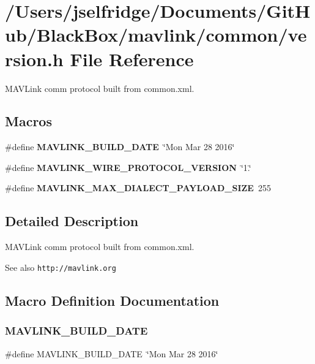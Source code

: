\section{/\+Users/jselfridge/\+Documents/\+Git\+Hub/\+Black\+Box/mavlink/common/version.h File Reference}
\label{common_2version_8h}


M\+A\+V\+Link comm protocol built from common.\+xml.  


\subsection*{Macros}
\begin{DoxyCompactItemize}
\item 
\#define \textbf{ M\+A\+V\+L\+I\+N\+K\+\_\+\+B\+U\+I\+L\+D\+\_\+\+D\+A\+TE}~\char`\"{}Mon Mar 28 2016\char`\"{}
\item 
\#define \textbf{ M\+A\+V\+L\+I\+N\+K\+\_\+\+W\+I\+R\+E\+\_\+\+P\+R\+O\+T\+O\+C\+O\+L\+\_\+\+V\+E\+R\+S\+I\+ON}~\char`\"{}1.\char`\"{}
\item 
\#define \textbf{ M\+A\+V\+L\+I\+N\+K\+\_\+\+M\+A\+X\+\_\+\+D\+I\+A\+L\+E\+C\+T\+\_\+\+P\+A\+Y\+L\+O\+A\+D\+\_\+\+S\+I\+ZE}~255
\end{DoxyCompactItemize}


\subsection{Detailed Description}
M\+A\+V\+Link comm protocol built from common.\+xml. 

\begin{DoxySeeAlso}{See also}
{\tt http\+://mavlink.\+org} 
\end{DoxySeeAlso}


\subsection{Macro Definition Documentation}
\mbox{\label{common_2version_8h_ab31250f0c93f71e42393b68a7cfe7585}} 
\subsubsection{M\+A\+V\+L\+I\+N\+K\+\_\+\+B\+U\+I\+L\+D\+\_\+\+D\+A\+TE}
{\footnotesize\ttfamily \#define M\+A\+V\+L\+I\+N\+K\+\_\+\+B\+U\+I\+L\+D\+\_\+\+D\+A\+TE~\char`\"{}Mon Mar 28 2016\char`\"{}}

